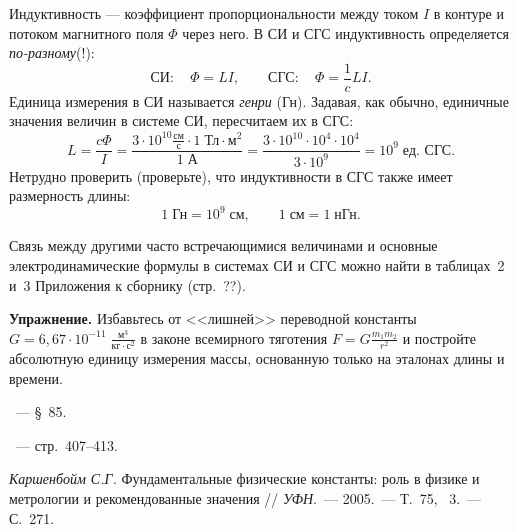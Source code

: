 Индуктивность --- коэффициент пропорциональности между током $I$
в контуре и потоком магнитного поля $\Phi$ через него. В СИ и СГС
индуктивность определяется \emph{по-разному}(!):
\[
\text{СИ}:\quad\Phi=LI,\qquad\text{СГС}:\quad\Phi=\frac{1}{c}LI.
\]
Единица измерения в СИ называется \emph{генри} (Гн). Задавая, как
обычно, единичные значения величин в системе СИ, пересчитаем их в
СГС:
\[
L=\frac{c\Phi}{I}=\frac{3\cdot10^{10}\frac{\text{см}}{\text{с}}\cdot1\;\text{Тл}\cdot\text{м}^{2}}{1\;\text{А}}=\frac{3\cdot10^{10}\cdot10^{4}\cdot10^{4}}{3\cdot10^{9}}=10^{9}\;\text{ед. СГС}.
\]
Нетрудно проверить (проверьте), что индуктивности в СГС также имеет
размерность длины:
\[
1\;\text{Гн}=10^{9}\;\text{см},\qquad1\;\text{см}=1\;\text{нГн}.
\]

Связь между другими часто встречающимися величинами и основные
электродинамические формулы в системах СИ и СГС можно найти в
таблицах~2 и~3 Приложения к сборнику (стр.~??).

\textbf{Упражнение.} Избавьтесь от <<лишней>> переводной
константы $G=6{,}67\cdot10^{-11}\;\frac{\text{м}^{3}}{\text{кг}\cdot\text{с}^{2}}$
в законе всемирного тяготения $F=G\frac{m_{1}m_{2}}{r^{2}}$ и постройте
абсолютную единицу измерения массы, основанную только на эталонах
длины и времени.

\begin{lab:literature}
    \item \SivuhinIII~--- \S~85.
    \item \Kirichenko~--- стр.~407--413.
    \item *\textit{Каршенбойм С.Г.} Фундаментальные физические константы: роль
    в физике и метрологии и рекомендованные значения // \emph{УФН}.~--- 2005.~---
    Т.~75, \textnumero~3.~--- С.~271.
\end{lab:literature}




